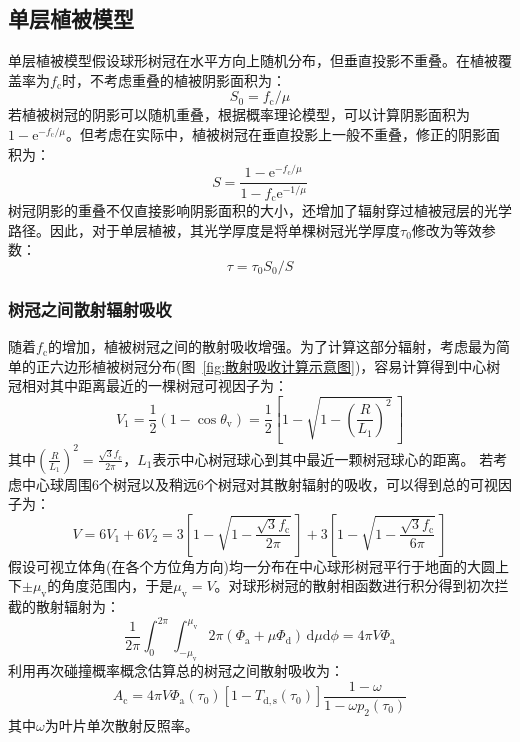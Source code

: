 \subsection{单层植被模型}
单层植被模型假设球形树冠在水平方向上随机分布，但垂直投影不重叠。在植被覆盖率为$f_{\mathrm {c}}$时，不考虑重叠的植被阴影面积为：
\begin{equation}
  S_{0}=f_{\mathrm{c}} / \mu
\end{equation}
若植被树冠的阴影可以随机重叠，根据概率理论模型，可以计算阴影面积为$1-{\mathrm e}^{-f_{\mathrm{c}}/\mu}$。但考虑在实际中，植被树冠在垂直投影上一般不重叠，修正的阴影面积为：
\begin{equation}\label{S_area}
  S=\frac{1-{\mathrm e}^{-f_{\mathrm{c}} / \mu}}{1-f_{\mathrm{c}} {\mathrm e}^{-1 / \mu}}
\end{equation}
树冠阴影的重叠不仅直接影响阴影面积的大小，还增加了辐射穿过植被冠层的光学路径。因此，对于单层植被，其光学厚度是将单棵树冠光学厚度$\tau_0$修改为等效参数：
\begin{equation}\label{tau}
  \tau=\tau_{0} S_{0} / S
\end{equation}

\subsubsection{树冠之间散射辐射吸收}
随着$f_{\mathrm {c}}$的增加，植被树冠之间的散射吸收增强。为了计算这部分辐射，考虑最为简单的正六边形植被树冠分布(图~\ref{fig:散射吸收计算示意图})，容易计算得到中心树冠相对其中距离最近的一棵树冠可视因子为：
\begin{equation}
  V_{1}=\frac{1}{2}\left(1-\cos \theta_{\mathrm{v}}\right)=\frac{1}{2}\left[1-\sqrt{1-\left(\frac{R}{L_{1}}\right)^{2}}\,\right]
\end{equation}
其中$\left(\frac{R}{L_{1}}\right)^{2}=\frac{\sqrt{3} f_{\mathrm{c}}}{2 \pi}$，$L_1$表示中心树冠球心到其中最近一颗树冠球心的距离。
若考虑中心球周围6个树冠以及稍远6个树冠对其散射辐射的吸收，可以得到总的可视因子为：
\begin{equation}
  V=6 V_{1}+6 V_{2}=3\left[1-\sqrt{1-\frac{\sqrt{3} f_{\mathrm{c}}}{2 \pi}}\,\right]+3\left[1-\sqrt{1-\frac{\sqrt{3} f_{\mathrm{c}}}{6 \pi}}\,\right]
\end{equation}
假设可视立体角(在各个方位角方向)均一分布在中心球形树冠平行于地面的大圆上下$\pm\mu_{\mathrm {v}}$的角度范围内，于是$\mu_{\mathrm {v}}=V$。对球形树冠的散射相函数进行积分得到初次拦截的散射辐射为：
\begin{equation}
  \frac{1}{2 \pi} \int_{0}^{2 \pi} \int_{-\mu_{\mathrm{{v}}}}^{\mu_{\mathrm{v}}} 2 \pi\left(\Phi_{\mathrm{a}}+\mu \Phi_{\mathrm{d}}\right)\,{\mathrm d} \mu {\mathrm d} \phi=4 \pi V \Phi_{\mathrm{a}}
\end{equation}
利用再次碰撞概率概念估算总的树冠之间散射吸收为：
\begin{equation}
  A_{\mathrm{c}}=4 \pi V \Phi_{\mathrm{a}}\left(\tau_{0}\right)\left[1-T_{\mathrm{d, s}}\left(\tau_{0}\right)\right] \frac{1-\omega}{1-\omega p_{2}\left(\tau_{0}\right)}
\end{equation}
其中$\omega$为叶片单次散射反照率。

